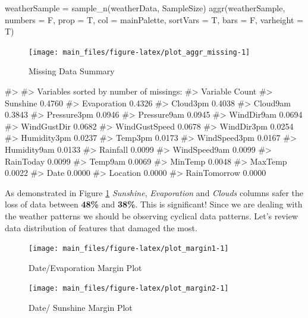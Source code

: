 \begin{Schunk}
\begin{Sinput}
weatherSample = sample_n(weatherData, SampleSize)
aggr(weatherSample, numbers = F, prop = T, col = mainPalette, sortVars = T, bars = F, varheight = T)
\end{Sinput}
\begin{figure}[H]

{\centering \texttt{[image: main\_files/figure-latex/plot\_aggr\_missing-1]} 

}

\caption[Missing Data Summary]{Missing Data Summary}\label{fig:plot_aggr_missing}
\end{figure}
\begin{Soutput}
#> 
#>  Variables sorted by number of missings: 
#>       Variable  Count
#>       Sunshine 0.4760
#>    Evaporation 0.4326
#>       Cloud3pm 0.4038
#>       Cloud9am 0.3843
#>    Pressure3pm 0.0946
#>    Pressure9am 0.0945
#>     WindDir9am 0.0694
#>    WindGustDir 0.0682
#>  WindGustSpeed 0.0678
#>     WindDir3pm 0.0254
#>    Humidity3pm 0.0237
#>        Temp3pm 0.0173
#>   WindSpeed3pm 0.0167
#>    Humidity9am 0.0133
#>       Rainfall 0.0099
#>   WindSpeed9am 0.0099
#>      RainToday 0.0099
#>        Temp9am 0.0069
#>        MinTemp 0.0048
#>        MaxTemp 0.0022
#>           Date 0.0000
#>       Location 0.0000
#>   RainTomorrow 0.0000
\end{Soutput}
\end{Schunk}

As demonstrated in Figure \ref{fig:plot_aggr_missing} \emph{Sunshine},
\emph{Evaporation} and \emph{Clouds} columns safer the loss of data
between \textbf{48\%} and \textbf{38\%}. This is significant! Since we
are dealing with the weather patterns we should be observing cyclical
data patterns. Let's review data distribution of features that damaged
the most.

\begin{Schunk}
\begin{figure}[H]

{\centering \texttt{[image: main\_files/figure-latex/plot\_margin1-1]} 

}

\caption[Date/Evaporation Margin Plot]{Date/Evaporation Margin Plot}\label{fig:plot_margin1}
\end{figure}
\end{Schunk}

\begin{Schunk}
\begin{figure}[H]

{\centering \texttt{[image: main\_files/figure-latex/plot\_margin2-1]} 

}

\caption[Date/ Sunshine Margin Plot]{Date/ Sunshine Margin Plot}\label{fig:plot_margin2}
\end{figure}
\end{Schunk}

